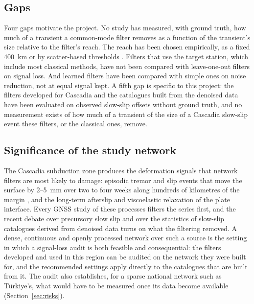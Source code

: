 \documentclass[preprint,12pt,authoryear]{elsarticle}
\begin{document}
\subsection{Gaps}

Four gaps motivate the project. No study has measured, with ground truth, how much of a transient a common-mode filter removes as a function of the transient's size relative to the filter's reach. The reach has been chosen empirically, as a fixed 400~km \citep{bachelot2025} or by scatter-based thresholds \citep{tianshen2016}. Filters that use the target station, which include most classical methods, have not been compared with leave-one-out filters on signal loss. And learned filters have been compared with simple ones on noise reduction, not at equal signal kept. A fifth gap is specific to this project: the filters developed for Cascadia \citep{bachelot2025, costantino2024} and the catalogues built from the denoised data \citep{costantino2026} have been evaluated on observed slow-slip offsets without ground truth, and no measurement exists of how much of a transient of the size of a Cascadia slow-slip event these filters, or the classical ones, remove.

\subsection{Significance of the study network}

The Cascadia subduction zone produces the deformation signals that network filters are most likely to damage: episodic tremor and slip events that move the surface by 2--5~mm over two to four weeks along hundreds of kilometres of the margin \citep{michel2019}, and the long-term afterslip and viscoelastic relaxation of the plate interface. Every GNSS study of these processes filters the series first, and the recent debate over precursory slow slip \citep{bletery2023, bletery2025} and over the statistics of slow-slip catalogues derived from denoised data \citep{costantino2026} turns on what the filtering removed. A dense, continuous and openly processed network over such a source is the setting in which a signal-loss audit is both feasible and consequential: the filters developed and used in this region \citep{bachelot2025, costantino2024} can be audited on the network they were built for, and the recommended settings apply directly to the catalogues that are built from it. The audit also establishes, for a sparse national network such as T\"urkiye's, what would have to be measured once its data become available (Section~\ref{sec:risks}).
\end{document}
